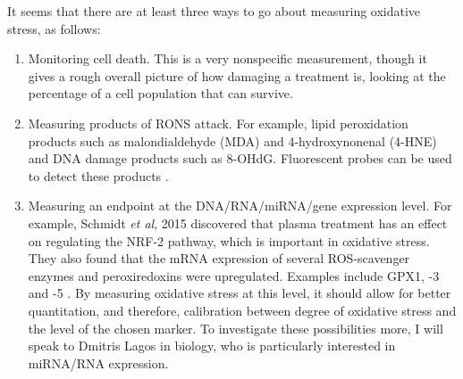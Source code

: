 \documentclass[11pt, oneside]{article}   	%
\begin{document}
It seems that there are at least three ways to go about measuring oxidative stress, as follows:
\begin{enumerate}
\item Monitoring cell death.
This is a very nonspecific measurement, though it gives a rough overall picture of how damaging a treatment is, looking at the percentage of a cell population that can survive.
\item Measuring products of RONS attack.
For example, lipid peroxidation products such as malondialdehyde (MDA) and 4-hydroxynonenal (4-HNE) \cite{Ayala2014lipid} and DNA damage products such as 8-OHdG. Fluorescent probes can be used to detect these products \cite{Ayala2014lipid, Joshi2011nonthermal, Joshi2010control}.
\item Measuring an endpoint at the DNA/RNA/miRNA/gene expression level.
For example, Schmidt \textit{et al}, 2015 discovered that plasma treatment has an effect on regulating the NRF-2 pathway, which is important in oxidative stress. They also found that the mRNA expression of several ROS-scavenger enzymes and peroxiredoxins were upregulated. Examples include GPX1, -3 and -5 \cite{Schmidt2015non}.
By measuring oxidative stress at this level, it should allow for better quantitation, and therefore, calibration between degree of oxidative stress and the level of the chosen marker.
To investigate these possibilities more, I will speak to Dmitris Lagos in biology, who is particularly interested in miRNA/RNA expression.

\end{enumerate}
\end{document}
